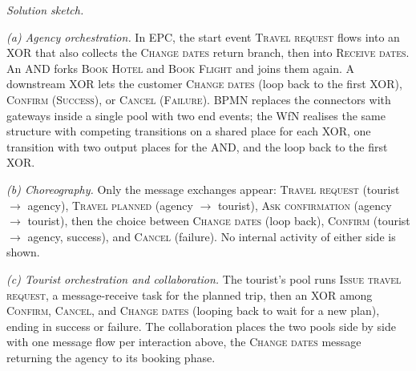 \textit{Solution sketch.}

\emph{(a) Agency orchestration.} In EPC, the start event \textsc{Travel request} flows into an XOR that also collects the \textsc{Change dates} return branch, then into \textsc{Receive dates}. An AND forks \textsc{Book Hotel} and \textsc{Book Flight} and joins them again. A downstream XOR lets the customer \textsc{Change dates} (loop back to the first XOR), \textsc{Confirm} (\textsc{Success}), or \textsc{Cancel} (\textsc{Failure}). BPMN replaces the connectors with gateways inside a single pool with two end events; the WfN realises the same structure with competing transitions on a shared place for each XOR, one transition with two output places for the AND, and the loop back to the first XOR.

\emph{(b) Choreography.} Only the message exchanges appear: \textsc{Travel request} (tourist $\to$ agency), \textsc{Travel planned} (agency $\to$ tourist), \textsc{Ask confirmation} (agency $\to$ tourist), then the choice between \textsc{Change dates} (loop back), \textsc{Confirm} (tourist $\to$ agency, success), and \textsc{Cancel} (failure). No internal activity of either side is shown.

\emph{(c) Tourist orchestration and collaboration.} The tourist's pool runs \textsc{Issue travel request}, a message-receive task for the planned trip, then an XOR among \textsc{Confirm}, \textsc{Cancel}, and \textsc{Change dates} (looping back to wait for a new plan), ending in success or failure. The collaboration places the two pools side by side with one message flow per interaction above, the \textsc{Change dates} message returning the agency to its booking phase.
